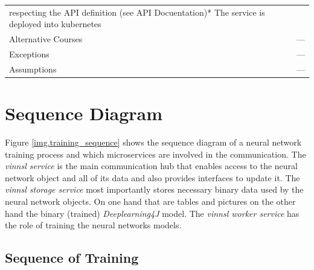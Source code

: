 \begin{longtable}[]{@{}ll@{}}
\begin{minipage}[t]{0.68\columnwidth}
respecting the API definition (see API Docuentation)* The service is
deployed into kubernetes\strut
\end{minipage}\tabularnewline
\begin{minipage}[t]{0.27\columnwidth}\raggedright\strut
Alternative Courses\strut
\end{minipage} & \begin{minipage}[t]{0.68\columnwidth}\raggedright\strut
---\strut
\end{minipage}\tabularnewline
\begin{minipage}[t]{0.27\columnwidth}\raggedright\strut
Exceptions\strut
\end{minipage} & \begin{minipage}[t]{0.68\columnwidth}\raggedright\strut
---\strut
\end{minipage}\tabularnewline
\begin{minipage}[t]{0.27\columnwidth}\raggedright\strut
Assumptions\strut
\end{minipage} & \begin{minipage}[t]{0.68\columnwidth}\raggedright\strut
---\strut
\end{minipage}\tabularnewline
\bottomrule
\end{longtable}

\section{Sequence Diagram}\label{sequence-diagram}

Figure \ref{img.training_sequence} shows the sequence diagram of a
neural network training process and which microservices are involved in
the communication. The \emph{vinnsl service} is the main communication
hub that enables access to the neural network object and all of its data
and also provides interfaces to update it. The \emph{vinnsl storage
service} most importantly stores necessary binary data used by the
neural network objects. On one hand that are tables and pictures on the
other hand the binary (trained) \emph{Deeplearning4J} model. The
\emph{vinnsl worker service} has the role of training the neural
networks models.

\subsection{Sequence of Training}\label{sequence-of-training}

